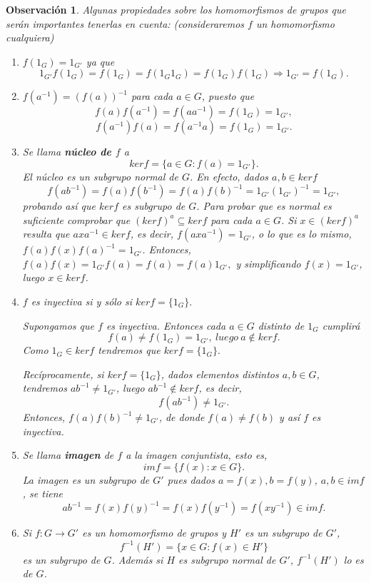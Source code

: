 \documentclass[12pt]{article}
\newtheorem{observation}{Observación}[theorem]
\begin{document}
\begin{observation} Algunas propiedades sobre los homomorfismos de grupos que serán importantes tenerlas en cuenta: (consideraremos $f$ un homomorfismo cualquiera)
\begin{enumerate}
\item $f(1_{G}) = 1_{G'}$ ya que $$1_{G'}f(1_{G}) = f(1_{G}) = f(1_{G}1_{G}) = f(1_{G})f(1_{G}) \Longrightarrow 1_{G'} = f(1_{G}).$$
\item $f(a^{-1}) = (f(a))^{-1}$ para cada $a \in G$, puesto que $$f(a)f(a^{-1}) = f(aa^{-1}) = f(1_{G}) = 1_{G'},$$ $$f(a^{-1})f(a) = f(a^{-1}a) = f(1_{G}) = 1_{G'}.$$
\item Se llama \textbf{núcleo de $f$} a $$ker f = \lbrace a \in G: f(a) = 1_{G'} \rbrace.$$
El núcleo es un subgrupo normal de $G$. En efecto, dados $a,b \in ker f$ $$f(ab^{-1}) = f(a)f(b^{-1}) = f(a)f(b)^{-1} = 1_{G'}(1_{G'})^{-1} = 1_{G'},$$ probando así que $ker f$ es subgrupo de $G$. Para probar que es normal es suficiente comprobar que $(ker f)^a \subseteq ker f$ para cada $a \in G$. Si $x \in (ker f)^a$ resulta que $axa^{-1} \in ker f$, es decir, $f(axa^{-1}) = 1_{G'}$, o lo que es lo mismo, $f(a)f(x)f(a)^{-1} = 1_{G'}$. Entonces, $f(a)f(x) = 1_{G'}f(a) = f(a) = f(a)1_{G'},$ y simplificando $f(x) = 1_{G'}$, luego $x \in ker f$.
\item $f$ es inyectiva si y sólo si $ker f = \lbrace 1_G \rbrace.$

Supongamos que $f$ es inyectiva. Entonces cada $a \in G$ distinto de $1_G$ cumplirá $$f(a) \neq f(1_G) = 1_{G'},~luego~a \notin ker f.$$ Como $1_G \in ker f$ tendremos que $ker f = \lbrace 1_G \rbrace.$

Recíprocamente, si $ker f = \lbrace 1_G \rbrace$, dados elementos distintos $a,b \in G$, tendremos $ab^{-1} \neq 1_{G'}$, luego $ab^{-1} \notin ker f$, es decir, $$f(ab^{-1}) \neq 1_{G'}.$$ Entonces, $f(a)f(b)^{-1} \neq 1_{G'}$, de donde $f(a) \neq f(b)$ y así $f$ es inyectiva.
\item Se llama \textbf{imagen} de $f$ a la imagen conjuntista, esto es, $$im f = \lbrace f(x) : x \in G \rbrace.$$ La imagen es un subgrupo de $G'$ pues dados $a = f(x), b = f(y)$, $a,b \in im f$, se tiene $$ab^{-1} = f(x)f(y)^{-1} = f(x)f(y^{-1}) = f(xy^{-1})  \in im f.$$
\item Si $f \colon G \longrightarrow G'$ es un homomorfismo de grupos y $H'$ es un subgrupo de $G'$, $$f^{-1}(H') = \lbrace x \in G : f(x) \in H'\rbrace$$ es un subgrupo de $G$. Además si $H$ es subgrupo normal de $G'$, $f^{-1}(H')$ lo es de $G$.


\end{enumerate}
\end{observation}
\end{document}

